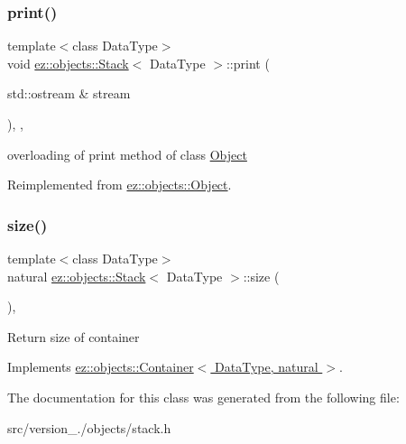 \subsubsection{\texorpdfstring{print()}{print()}}
{\footnotesize\ttfamily template$<$class Data\+Type$>$ \\
void \hyperlink{classez_1_1objects_1_1Stack}{ez\+::objects\+::\+Stack}$<$ Data\+Type $>$\+::print (\begin{DoxyParamCaption}\item[{std\+::ostream \&}]{stream }\end{DoxyParamCaption})\hspace{0.3cm}{\ttfamily [inline]}, {\ttfamily [override]}, {\ttfamily [virtual]}}

overloading of print method of class \hyperlink{classez_1_1objects_1_1Object}{Object} 

Reimplemented from \hyperlink{classez_1_1objects_1_1Object_a9e20f39a78163f67f000576149d858b3}{ez\+::objects\+::\+Object}.

\mbox{\label{classez_1_1objects_1_1Stack_a470a691a71af423a7d30719fd71cd385}} 
\subsubsection{\texorpdfstring{size()}{size()}}
{\footnotesize\ttfamily template$<$class Data\+Type$>$ \\
natural \hyperlink{classez_1_1objects_1_1Stack}{ez\+::objects\+::\+Stack}$<$ Data\+Type $>$\+::size (\begin{DoxyParamCaption}{ }\end{DoxyParamCaption})\hspace{0.3cm}{\ttfamily [inline]}, {\ttfamily [virtual]}}

Return size of container 

Implements \hyperlink{classez_1_1objects_1_1Container_affd294810c6c29530d1d1e3c2151ad28}{ez\+::objects\+::\+Container$<$ Data\+Type, natural $>$}.



The documentation for this class was generated from the following file\+:\begin{DoxyCompactItemize}
\item 
src/version\+\_./objects/stack.\+h\end{DoxyCompactItemize}

